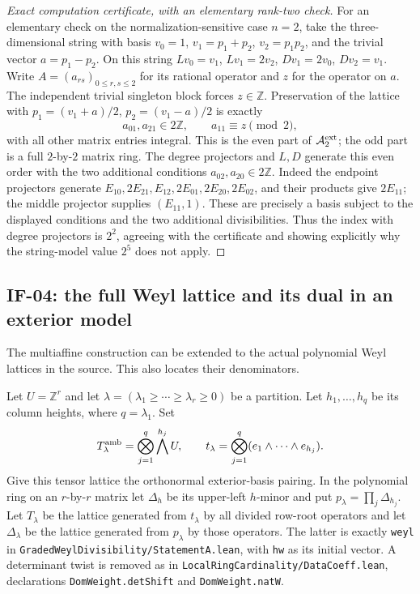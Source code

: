 \begin{proof}[Exact computation certificate, with an elementary rank-two check]
For an elementary check on the normalization-sensitive case $n=2$, take
the three-dimensional string with basis
$v_0=1$, $v_1=p_1+p_2$, $v_2=p_1p_2$, and the trivial vector
$a=p_1-p_2$. On this string
$Lv_0=v_1$, $Lv_1=2v_2$, $Dv_1=2v_0$, $Dv_2=v_1$.
Write $A=(a_{rs})_{0\leq r,s\leq2}$ for its rational operator and
$z$ for the operator on $a$. The independent trivial singleton
block forces $z\in\mathbb Z$. Preservation of the lattice with
$p_1=(v_1+a)/2$, $p_2=(v_1-a)/2$ is exactly
\[
 a_{01},a_{21}\in2\mathbb Z,\qquad
 a_{11}\equiv z\pmod2,
\]
with all other matrix entries integral. This is the even part of
$\mathcal A_2^{\rm ext}$; the odd part is a full $2$-by-$2$ matrix ring.
The degree projectors and $L,D$ generate this even order with the two
additional conditions $a_{02},a_{20}\in2\mathbb Z$. Indeed the endpoint
projectors generate
$E_{10},2E_{21},E_{12},2E_{01},2E_{20},2E_{02}$,
and their products give $2E_{11}$; the middle projector supplies
$(E_{11},1)$. These are precisely a basis subject to the displayed
conditions and the two additional divisibilities. Thus the index with
degree projectors is $2^2$, agreeing with the certificate and showing
explicitly why the string-model value $2^5$ does not apply.
\end{proof}

\subsection{IF-04: the full Weyl lattice and its dual in an exterior model}
The multiaffine construction can be extended to the actual polynomial
Weyl lattices in the source. This also locates their denominators.

Let $U=\mathbb Z^r$ and let $\lambda=(\lambda_1\geq\cdots\geq
\lambda_r\geq0)$ be a partition. Let $h_1,\ldots,h_q$ be its column
heights, where $q=\lambda_1$. Set
\[
 T^{\rm amb}_\lambda=\bigotimes_{j=1}^q\bigwedge^{h_j}U,
 \qquad t_\lambda=\bigotimes_{j=1}^q(e_1\wedge\cdots\wedge e_{h_j}).
\]
Give this tensor lattice the orthonormal exterior-basis pairing. In the
polynomial ring on an $r$-by-$r$ matrix let $\Delta_h$ be its upper-left
$h$-minor and put $p_\lambda=\prod_j\Delta_{h_j}$.
Let $T_\lambda$ be the lattice generated from $t_\lambda$ by all divided
row-root operators and let $\Delta_\lambda$ be the lattice generated
from $p_\lambda$ by those operators. The latter is exactly
\texttt{weyl} in \texttt{GradedWeylDivisibility/StatementA.lean},
with \texttt{hw} as its initial vector. A determinant twist is removed
as in \texttt{LocalRingCardinality/DataCoeff.lean}, declarations
\texttt{DomWeight.detShift} and \texttt{DomWeight.natW}.

